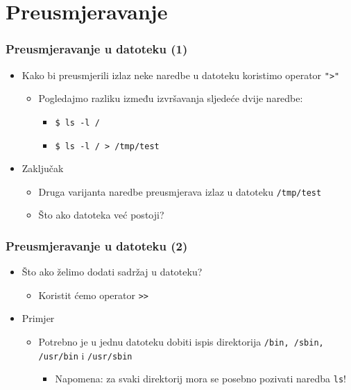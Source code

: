 \documentclass{beamer}
\newcommand{\shell}[1]{\texttt{#1}}
\begin{document}
\section{Preusmjeravanje}
\begin{frame}[t]
\frametitle{Preusmjeravanje u datoteku (1)}
\begin{itemize}
  \item Kako bi preusmjerili izlaz neke naredbe u datoteku koristimo 
        operator \shell{">"}
  \begin{itemize}
    \item Pogledajmo razliku između izvršavanja sljedeće dvije naredbe:
    \begin{itemize}
      \item[] \shell{\$ ls -l /}
      \item[] \shell{\$ ls -l / > /tmp/test}
    \end{itemize}
  \end{itemize}
  \item Zaključak
  \begin{itemize}
    \item Druga varijanta naredbe preusmjerava izlaz u datoteku 
          \shell{/tmp/test} 
    \item Što ako datoteka već postoji?
  \end{itemize}
\end{itemize}
\end{frame}

\begin{frame}[t]
\frametitle{Preusmjeravanje u datoteku (2)}
\begin{itemize}
  \item Što ako želimo dodati sadržaj u datoteku?
  \begin{itemize}
    \item Koristit ćemo operator \shell{>>}
  \end{itemize}
  \item Primjer
  \begin{itemize}
    \item Potrebno je u jednu datoteku dobiti ispis direktorija 
          \shell{/bin, /sbin, /usr/bin} i \shell{/usr/sbin}
    \begin{itemize} 
      \item Napomena: za svaki direktorij mora se posebno pozivati 
              naredba \shell{ls}!
    \end{itemize}
  \end{itemize}
\end{itemize}
\end{frame}
\end{document}
